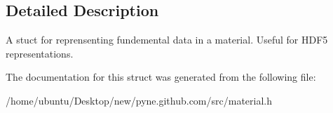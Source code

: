 \subsection{Detailed Description}
A stuct for reprensenting fundemental data in a material. Useful for H\+D\+F5 representations. 

The documentation for this struct was generated from the following file\+:\begin{DoxyCompactItemize}
\item 
/home/ubuntu/\+Desktop/new/pyne.\+github.\+com/src/material.\+h\end{DoxyCompactItemize}
